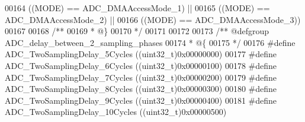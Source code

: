 \begin{DoxyCode}
00164                                       \textcolor{preprocessor}{(}\textcolor{preprocessor}{(}\textcolor{preprocessor}{MODE}\textcolor{preprocessor}{)} \textcolor{preprocessor}{==} ADC_DMAAccessMode_1\textcolor{preprocessor}{)} \textcolor{preprocessor}{||}
00165                                       \textcolor{preprocessor}{(}\textcolor{preprocessor}{(}\textcolor{preprocessor}{MODE}\textcolor{preprocessor}{)} \textcolor{preprocessor}{==} ADC_DMAAccessMode_2\textcolor{preprocessor}{)} \textcolor{preprocessor}{||}
00166                                       \textcolor{preprocessor}{(}\textcolor{preprocessor}{(}\textcolor{preprocessor}{MODE}\textcolor{preprocessor}{)} \textcolor{preprocessor}{==} ADC_DMAAccessMode_3\textcolor{preprocessor}{)}\textcolor{preprocessor}{)}
00167 
00168 \textcolor{comment}{/**}
00169 \textcolor{comment}{  * @\}}
00170 \textcolor{comment}{  */}
00171 
00172 
00173 \textcolor{comment}{/** @defgroup ADC\_delay\_between\_2\_sampling\_phases }
00174 \textcolor{comment}{  * @\{}
00175 \textcolor{comment}{  */}
00176 \textcolor{preprocessor}{#}\textcolor{preprocessor}{define} \textcolor{preprocessor}{ADC\_TwoSamplingDelay\_5Cycles}               \textcolor{preprocessor}{(}\textcolor{preprocessor}{(}\textcolor{preprocessor}{uint32\_t}\textcolor{preprocessor}{)}0x00000000\textcolor{preprocessor}{)}
00177 \textcolor{preprocessor}{#}\textcolor{preprocessor}{define} \textcolor{preprocessor}{ADC\_TwoSamplingDelay\_6Cycles}               \textcolor{preprocessor}{(}\textcolor{preprocessor}{(}\textcolor{preprocessor}{uint32\_t}\textcolor{preprocessor}{)}0x00000100\textcolor{preprocessor}{)}
00178 \textcolor{preprocessor}{#}\textcolor{preprocessor}{define} \textcolor{preprocessor}{ADC\_TwoSamplingDelay\_7Cycles}               \textcolor{preprocessor}{(}\textcolor{preprocessor}{(}\textcolor{preprocessor}{uint32\_t}\textcolor{preprocessor}{)}0x00000200\textcolor{preprocessor}{)}
00179 \textcolor{preprocessor}{#}\textcolor{preprocessor}{define} \textcolor{preprocessor}{ADC\_TwoSamplingDelay\_8Cycles}               \textcolor{preprocessor}{(}\textcolor{preprocessor}{(}\textcolor{preprocessor}{uint32\_t}\textcolor{preprocessor}{)}0x00000300\textcolor{preprocessor}{)}
00180 \textcolor{preprocessor}{#}\textcolor{preprocessor}{define} \textcolor{preprocessor}{ADC\_TwoSamplingDelay\_9Cycles}               \textcolor{preprocessor}{(}\textcolor{preprocessor}{(}\textcolor{preprocessor}{uint32\_t}\textcolor{preprocessor}{)}0x00000400\textcolor{preprocessor}{)}
00181 \textcolor{preprocessor}{#}\textcolor{preprocessor}{define} \textcolor{preprocessor}{ADC\_TwoSamplingDelay\_10Cycles}              \textcolor{preprocessor}{(}\textcolor{preprocessor}{(}\textcolor{preprocessor}{uint32\_t}\textcolor{preprocessor}{)}0x00000500\textcolor{preprocessor}{)}

\end{DoxyCode}
